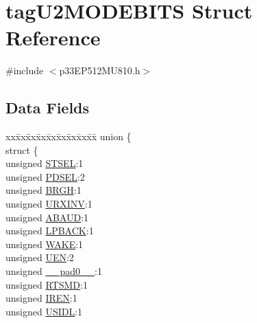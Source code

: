 \hypertarget{structtag_u2_m_o_d_e_b_i_t_s}{}\section{tag\+U2\+M\+O\+D\+E\+B\+I\+TS Struct Reference}
\label{structtag_u2_m_o_d_e_b_i_t_s}


{\ttfamily \#include $<$p33\+E\+P512\+M\+U810.\+h$>$}

\subsection*{Data Fields}
\begin{DoxyCompactItemize}
\item 
\begin{tabbing}
xx\=xx\=xx\=xx\=xx\=xx\=xx\=xx\=xx\=\kill
union \{\\
\>struct \{\\
\>\>unsigned \hyperlink{structtag_u2_m_o_d_e_b_i_t_s_a3d57376019f3ed30d788c5ad72938796}{STSEL}:1\\
\>\>unsigned \hyperlink{structtag_u2_m_o_d_e_b_i_t_s_acc0b2e4d43c615d3c033391b5c4a2d1b}{PDSEL}:2\\
\>\>unsigned \hyperlink{structtag_u2_m_o_d_e_b_i_t_s_a5ac4f749c73f2dfc0f8699b73fe251fc}{BRGH}:1\\
\>\>unsigned \hyperlink{structtag_u2_m_o_d_e_b_i_t_s_ab6387939f9a8bc487f0eab6e20afd53d}{URXINV}:1\\
\>\>unsigned \hyperlink{structtag_u2_m_o_d_e_b_i_t_s_aeb177356d5f30b6f3a28d8d65c4950f5}{ABAUD}:1\\
\>\>unsigned \hyperlink{structtag_u2_m_o_d_e_b_i_t_s_a138f7c04973519ef4dfe9bbc1610cbc0}{LPBACK}:1\\
\>\>unsigned \hyperlink{structtag_u2_m_o_d_e_b_i_t_s_a364c8b1b2c2f66b23dd1093ced3e20dd}{WAKE}:1\\
\>\>unsigned \hyperlink{structtag_u2_m_o_d_e_b_i_t_s_a2c884c6d86506e0a73df50998a97c1f9}{UEN}:2\\
\>\>unsigned \hyperlink{structtag_u2_m_o_d_e_b_i_t_s_adf71f3d8410c1f1dbbc96680a92c49af}{\_\_pad0\_\_}:1\\
\>\>unsigned \hyperlink{structtag_u2_m_o_d_e_b_i_t_s_a76bdbed23aeadbbf3d0d078bc48cc19f}{RTSMD}:1\\
\>\>unsigned \hyperlink{structtag_u2_m_o_d_e_b_i_t_s_a7e60ff69eada9f471fa59afdbaf29e93}{IREN}:1\\
\>\>unsigned \hyperlink{structtag_u2_m_o_d_e_b_i_t_s_a94d25c6c9271a4ab4f450319e34e2a00}{USIDL}:1\\

\end{tabbing}
\end{DoxyCompactItemize}
